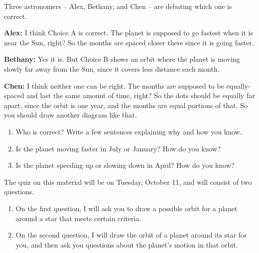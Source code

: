 \documentclass[12pt]{article}
\begin{document}
Three astronomers -- Alex, Bethany, and Chen -- are debating which one is correct.


{\bf Alex:} I think Choice A is correct. The planet is supposed to go fastest when it is near the Sun, right? So the months are spaced closer there since it is going faster.

{\bf Bethany:} Yes it is. But Choice B shows an orbit where the planet is moving slowly far away from the Sun, since it covers less distance each month.

{\bf Chen:} I think neither one can be right. The months are supposed to be equally-spaced and last the same amount of time, right? So the dots should be equally far apart, since the orbit is one year, and the months are equal portions of that. So you should draw another diagram like that.
\begin{enumerate}	

\item Who is correct? Write a few sentences explaining why and how you know.


\vspace{3in}

\item Is the planet moving faster in July or January? How do you know?


\vspace{1.5in}

\item Is the planet speeding up or slowing down in April? How do you know?

\vspace{1.5in}
	
\end{enumerate}

\begin{center}\underline{\hspace{3in}}\end{center}

The quiz on this material will be on Tuesday, October 11, and will consist of two questions.

\begin{enumerate}
	\item On the first question, I will ask you to draw a possible orbit for a planet around a star that meets certain criteria.
	
	\item On the second question, I will draw the orbit of a planet around its star for you, and then ask you questions about the planet's motion in that orbit.
\end{enumerate}

	
\end{document}
